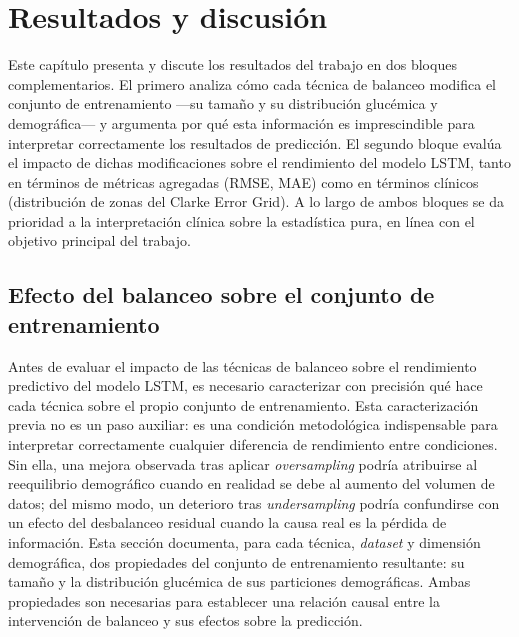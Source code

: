 \chapter{Resultados y discusión}
\label{chapter:resultados}

Este capítulo presenta y discute los resultados del trabajo en dos bloques complementarios. El primero analiza cómo cada técnica de balanceo modifica el conjunto de entrenamiento —su tamaño y su distribución glucémica y demográfica— y argumenta por qué esta información es imprescindible para interpretar correctamente los resultados de predicción. El segundo bloque evalúa el impacto de dichas modificaciones sobre el rendimiento del modelo LSTM, tanto en términos de métricas agregadas (RMSE, MAE) como en términos clínicos (distribución de zonas del Clarke Error Grid). A lo largo de ambos bloques se da prioridad a la interpretación clínica sobre la estadística pura, en línea con el objetivo principal del trabajo.

\section{Efecto del balanceo sobre el conjunto de entrenamiento}
\label{sec:efecto_balanceo_trainset}


Antes de evaluar el impacto de las técnicas de balanceo sobre el rendimiento
predictivo del modelo LSTM, es necesario caracterizar con precisión qué hace
cada técnica sobre el propio conjunto de entrenamiento. Esta caracterización
previa no es un paso auxiliar: es una condición metodológica indispensable para
interpretar correctamente cualquier diferencia de rendimiento entre condiciones.
Sin ella, una mejora observada tras aplicar \textit{oversampling} podría
atribuirse al reequilibrio demográfico cuando en realidad se debe al aumento
del volumen de datos; del mismo modo, un deterioro tras \textit{undersampling}
podría confundirse con un efecto del desbalanceo residual cuando la causa real
es la pérdida de información. Esta sección documenta, para cada técnica,
\textit{dataset} y dimensión demográfica, dos propiedades del conjunto de
entrenamiento resultante: su tamaño y la distribución glucémica de sus
particiones demográficas. Ambas propiedades son necesarias para establecer
una relación causal entre la intervención de balanceo y sus efectos sobre
la predicción.


